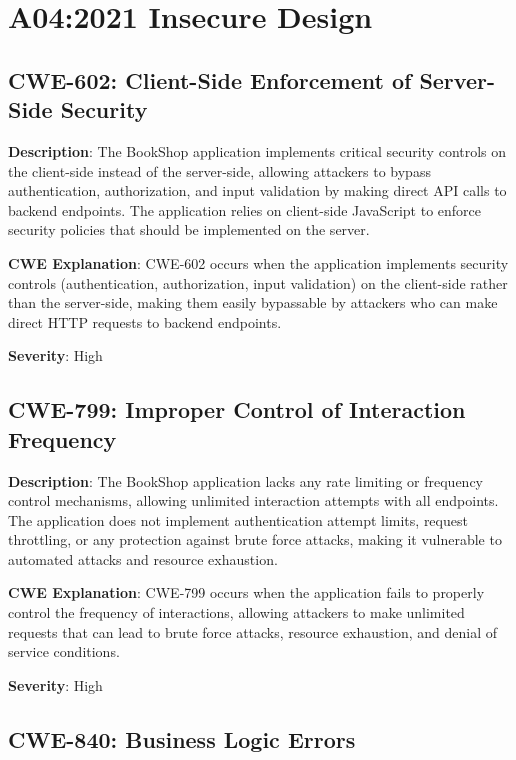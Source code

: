 \documentclass[]{UCD_CS_FYP_Report}
\begin{document}
\chapter{A04:2021 Insecure Design}

\section{CWE-602: Client-Side Enforcement of Server-Side Security}

\textbf{Description}: The BookShop application implements critical security controls on the client-side instead of the server-side, allowing attackers to bypass authentication, authorization, and input validation by making direct API calls to backend endpoints. The application relies on client-side JavaScript to enforce security policies that should be implemented on the server.

\textbf{CWE Explanation}: CWE-602 occurs when the application implements security controls (authentication, authorization, input validation) on the client-side rather than the server-side, making them easily bypassable by attackers who can make direct HTTP requests to backend endpoints.

\textbf{Severity}: High



\section{CWE-799: Improper Control of Interaction Frequency}

\textbf{Description}: The BookShop application lacks any rate limiting or frequency control mechanisms, allowing unlimited interaction attempts with all endpoints. The application does not implement authentication attempt limits, request throttling, or any protection against brute force attacks, making it vulnerable to automated attacks and resource exhaustion.

\textbf{CWE Explanation}: CWE-799 occurs when the application fails to properly control the frequency of interactions, allowing attackers to make unlimited requests that can lead to brute force attacks, resource exhaustion, and denial of service conditions.

\textbf{Severity}: High



\section{CWE-840: Business Logic Errors}
\end{document}
